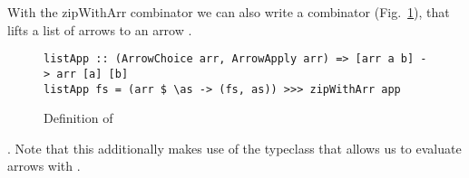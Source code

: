 With the zipWithArr combinator we can also write a combinator  (Fig.~\ref{fig:listApp}), that lifts a list of arrows \inlinecode{[arr a b]} to an arrow .
\begin{figure}[h]
\begin{lstlisting}[frame=htrbl]
listApp :: (ArrowChoice arr, ArrowApply arr) => [arr a b] -> arr [a] [b]
listApp fs = (arr $ \as -> (fs, as)) >>> zipWithArr app
\end{lstlisting}
\caption{Definition of }
\label{fig:listApp}
\end{figure}
. Note that  this additionally makes use of the  typeclass that allows us to evaluate arrows with .



